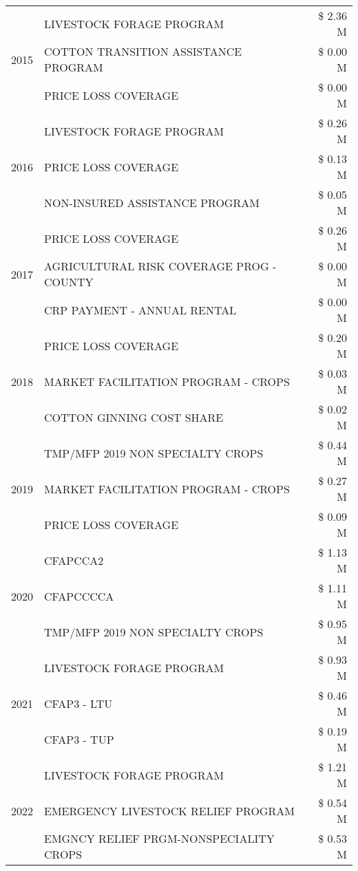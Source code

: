 \begin{tabular}{llr}
\multirow[t]{3}{*}{2015} & LIVESTOCK FORAGE PROGRAM & \$ 2.36 M \\
 & COTTON TRANSITION ASSISTANCE PROGRAM & \$ 0.00 M \\
 & PRICE LOSS COVERAGE & \$ 0.00 M \\
\cline{1-3}
\multirow[t]{3}{*}{2016} & LIVESTOCK FORAGE PROGRAM & \$ 0.26 M \\
 & PRICE LOSS COVERAGE & \$ 0.13 M \\
 & NON-INSURED ASSISTANCE PROGRAM & \$ 0.05 M \\
\cline{1-3}
\multirow[t]{3}{*}{2017} & PRICE LOSS COVERAGE & \$ 0.26 M \\
 & AGRICULTURAL RISK COVERAGE PROG - COUNTY & \$ 0.00 M \\
 & CRP PAYMENT - ANNUAL RENTAL & \$ 0.00 M \\
\cline{1-3}
\multirow[t]{3}{*}{2018} & PRICE LOSS COVERAGE & \$ 0.20 M \\
 & MARKET FACILITATION PROGRAM - CROPS & \$ 0.03 M \\
 & COTTON GINNING COST SHARE & \$ 0.02 M \\
\cline{1-3}
\multirow[t]{3}{*}{2019} & TMP/MFP 2019 NON SPECIALTY CROPS & \$ 0.44 M \\
 & MARKET FACILITATION PROGRAM - CROPS & \$ 0.27 M \\
 & PRICE LOSS COVERAGE & \$ 0.09 M \\
\cline{1-3}
\multirow[t]{3}{*}{2020} & CFAPCCA2 & \$ 1.13 M \\
 & CFAPCCCCA & \$ 1.11 M \\
 & TMP/MFP 2019 NON SPECIALTY CROPS & \$ 0.95 M \\
\cline{1-3}
\multirow[t]{3}{*}{2021} & LIVESTOCK FORAGE PROGRAM & \$ 0.93 M \\
 & CFAP3 - LTU & \$ 0.46 M \\
 & CFAP3 - TUP & \$ 0.19 M \\
\cline{1-3}
\multirow[t]{3}{*}{2022} & LIVESTOCK FORAGE PROGRAM & \$ 1.21 M \\
 & EMERGENCY LIVESTOCK RELIEF PROGRAM & \$ 0.54 M \\
 & EMGNCY RELIEF PRGM-NONSPECIALITY CROPS & \$ 0.53 M \\
\cline{1-3}
\bottomrule
\end{tabular}
